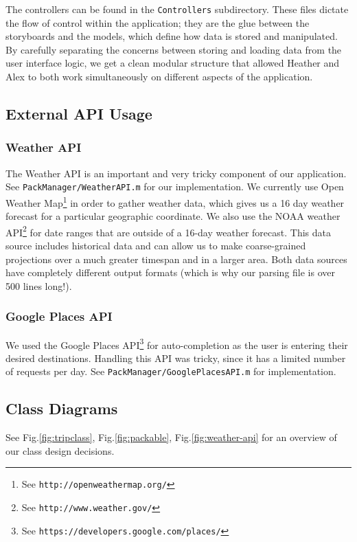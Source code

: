 \documentclass[11pt]{article}
\begin{document}
    The controllers can be found in the \texttt{Controllers} subdirectory. These files dictate the flow of control within the application; they are the glue between the storyboards and the models, which define how data is stored and manipulated. By carefully separating the concerns between storing and loading data from the user interface logic, we get a clean modular structure that allowed Heather and Alex to both work simultaneously on different aspects of the application. 



    \subsection{External API Usage}
    \subsubsection{Weather API}
    The Weather API is an important and very tricky component of our application. See \texttt{PackManager/WeatherAPI.m} for our implementation. We currently use Open Weather Map\footnote{See \texttt{http://openweathermap.org/}} in order to gather weather data, which gives us a 16 day weather forecast for a particular geographic coordinate. We also use the NOAA weather API\footnote{See \texttt{http://www.weather.gov/}} for date ranges that are outside of a 16-day weather forecast. This data source includes historical data and can allow us to make coarse-grained projections over a much greater timespan and in a larger area. Both data sources have completely different output formats (which is why our parsing file is over 500 lines long!).

    \subsubsection{Google Places API}
    We used the Google Places API\footnote{See \texttt{https://developers.google.com/places/}} for auto-completion as the user is entering their desired destinations. Handling this API was tricky, since it has a limited number of requests per day. See \texttt{PackManager/GooglePlacesAPI.m} for implementation.


    \subsection{Class Diagrams}
    See Fig.\ref{fig:tripclass}, Fig.\ref{fig:packable}, Fig.\ref{fig:weather-api} for an overview of our class design decisions. 
\end{document}
